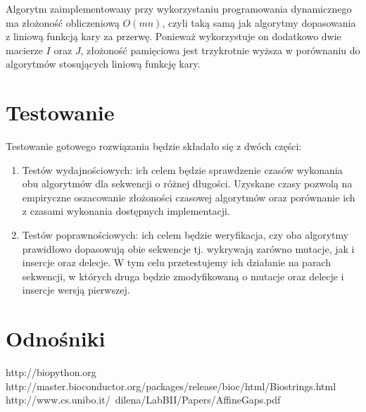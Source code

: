 \documentclass[a4paper,10pt]{article}
\begin{document}
	
	Algorytm zaimplementowany przy wykorzystaniu programowania dynamicznego ma złożoność obliczeniową $O(mn)$, czyli taką samą jak algorytmy dopasowania z liniową funkcją kary za przerwę. Ponieważ wykorzystuje on dodatkowo dwie macierze $I$ oraz $J$, złożoność pamięciowa jest trzykrotnie wyższa w porównaniu do algorytmów stosujących liniową funkcję kary.

	\section{Testowanie}

	Testowanie gotowego rozwiązania będzie składało się z dwóch części:
	\begin{enumerate}
		\item Testów wydajnościowych: ich celem będzie sprawdzenie czasów wykonania obu algorytmów dla sekwencji o różnej długości. Uzyskane czasy pozwolą na empiryczne oszacowanie złożoności czasowej algorytmów oraz porównanie ich z czasami wykonania dostępnych implementacji.
		\item Testów poprawnościowych: ich celem będzie weryfikacja, czy oba algorytmy prawidłowo dopasowują obie sekwencje tj. wykrywają zarówno mutacje, jak i insercje oraz delecje. W tym celu przetestujemy ich działanie na parach sekwencji, w których druga będzie zmodyfikowaną o mutacje oraz delecje i insercje wersją pierwszej.
	\end{enumerate}

	\section{Odnośniki}

	\begin{thebibliography}{99}
		 http://biopython.org
		 http://master.bioconductor.org/packages/release/bioc/html/Biostrings.html
		 http://www.cs.unibo.it/~dilena/LabBII/Papers/AffineGaps.pdf
	\end{thebibliography}
\end{document}
